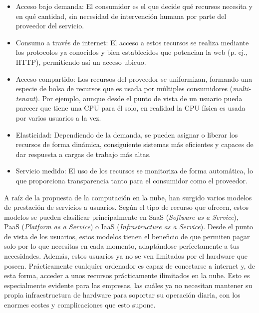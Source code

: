 \begin{itemize}
  \item Acceso bajo demanda: El consumidor es el que decide qué recursos
        necesita y en qué cantidad, sin necesidad de intervención humana por parte del
        proveedor del servicio.
  \item Consumo a través de internet: El acceso a estos recursos se realiza
        mediante los protocolos ya conocidos y bien establecidos que potencian la web
        (p. ej., HTTP), permitiendo así un acceso ubicuo.
  \item Acceso compartido: Los recursos del proveedor se uniformizan, formando
        una especie de bolsa de recursos que es usada por múltiples consumidores
        (\textit{multi-tenant}). Por ejemplo, aunque desde el punto de vista de un
        usuario pueda parecer que tiene una CPU para él solo, en realidad la CPU
        física es usada por varios usuarios a la vez.
  \item Elasticidad: Dependiendo de la demanda, se pueden asignar o liberar los
        recursos de forma dinámica, consiguiente sistemas más eficientes y capaces de
        dar respuesta a cargas de trabajo más altas.
  \item Servicio medido: El uso de los recursos se monitoriza de forma
        automática, lo que proporciona transparencia tanto para el consumidor como el
        proveedor.
\end{itemize}

A raíz de la propuesta de la computación en la nube, han surgido varios modelos
de prestación de servicios a usuarios. Según el tipo de recurso que ofrecen,
estos modelos se pueden clasificar principalmente en SaaS (\textit{Software as
  a Service}), PaaS (\textit{Platform as a Service}) o IaaS
(\textit{Infrastructure as a Service}). Desde el punto de vista de los usuarios,
estos modelos tienen el beneficio de que permiten pagar solo por lo que
necesitas en cada momento, adaptándose perfectamente a tus necesidades. Además,
estos usuarios ya no se ven limitados por el hardware que poseen. Prácticamente
cualquier ordenador es capaz de conectarse a internet y, de esta forma, acceder
a unos recursos prácticamente ilimitados en la nube. Esto es especialmente
evidente para las empresas, las cuáles ya no necesitan mantener su propia
infraestructura de hardware para soportar su operación diaria, con los enormes
costes y complicaciones que esto supone.

